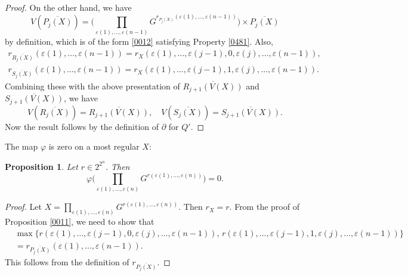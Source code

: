 \documentclass{amsart}
\newtheorem{Prop}[Thm]{Proposition}
\theoremstyle{remark}
\numberwithin{equation}{subsection}
\newcommand{\closure}[1]{\overline{#1}}
\begin{document}
\begin{proof}
	On the other hand, we have
		\[
				V(\closure{P_{j}(X)})
			=
				\biggl(
					\prod_{\varepsilon(1), \dots, \varepsilon(n - 1)}
						G^{r_{\closure{P_{j}(X)}}(\varepsilon(1), \dots, \varepsilon(n - 1))}
				\biggr)
			\times
				\closure{P_{j}(X)}
		\]
	by definition, which is of the form \eqref{0012} satisfying Property \eqref{0481}.
	Also,
		\begin{gather*}
					r_{\closure{R_{j}(X)}}(\varepsilon(1), \dots, \varepsilon(n - 1))
				=
					r_{X}(\varepsilon(1), \dots, \varepsilon(j - 1), 0, \varepsilon(j), \dots, \varepsilon(n - 1)),
			\\
					r_{\closure{S_{j}(X)}}(\varepsilon(1), \dots, \varepsilon(n - 1))
				=
					r_{X}(\varepsilon(1), \dots, \varepsilon(j - 1), 1, \varepsilon(j), \dots, \varepsilon(n - 1)).
		\end{gather*}
	Combining these with the above presentation of
	$\closure{R_{j + 1}(V(X))}$ and $\closure{S_{j + 1}(V(X))}$, we have
		\[
				V(\closure{R_{j}(X)})
			=
				\closure{R_{j + 1}(V(X))},
			\quad
				V(\closure{S_{j}(X)})
			=
				\closure{S_{j + 1}(V(X))}.
		\]
	Now the result follows by the definition of $\partial$ for $Q'$.
\end{proof}

The map $\varphi$ is zero on a most regular $X$:

\begin{Prop} \label{0013}
	Let $r \in 2^{2^{n}}$.
	Then
		\[
				\varphi \biggl(
					\prod_{\varepsilon(1), \dots, \varepsilon(n)}
						G^{r(\varepsilon(1), \dots, \varepsilon(n))}
				\biggr)
			=
				0.
		\]
\end{Prop}

\begin{proof}
	Let $X = \prod_{\varepsilon(1), \dots, \varepsilon(n)}
	G^{r(\varepsilon(1), \dots, \varepsilon(n))}$.
	Then $r_{X} = r$.
	From the proof of Proposition \ref{0011},
	we need to show that
		\begin{align*}
			&		\max
					\bigl\{
						r(\varepsilon(1), \dots, \varepsilon(j - 1), 0, \varepsilon(j), \dots, \varepsilon(n - 1)),\,
						r(\varepsilon(1), \dots, \varepsilon(j - 1), 1, \varepsilon(j), \dots, \varepsilon(n - 1))
					\bigr\}
			\\
			&	=
					r_{\closure{P_{j}(X)}}(\varepsilon(1), \dots, \varepsilon(n - 1)).
		\end{align*}
	This follows from the definition of $r_{\closure{P_{j}(X)}}$.
\end{proof}
\end{document}
